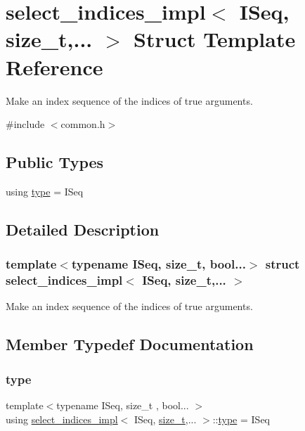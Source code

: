 \hypertarget{structselect__indices__impl}{}\section{select\+\_\+indices\+\_\+impl$<$ I\+Seq, size\+\_\+t,... $>$ Struct Template Reference}
\label{structselect__indices__impl}


Make an index sequence of the indices of true arguments.  




{\ttfamily \#include $<$common.\+h$>$}

\subsection*{Public Types}
\begin{DoxyCompactItemize}
\item 
using \mbox{\hyperlink{structselect__indices__impl_a257bb6e0d732031707917925f457fa16}{type}} = I\+Seq
\end{DoxyCompactItemize}


\subsection{Detailed Description}
\subsubsection*{template$<$typename I\+Seq, size\+\_\+t, bool...$>$\newline
struct select\+\_\+indices\+\_\+impl$<$ I\+Seq, size\+\_\+t,... $>$}

Make an index sequence of the indices of true arguments. 

\subsection{Member Typedef Documentation}
\mbox{\label{structselect__indices__impl_a257bb6e0d732031707917925f457fa16}} 
\subsubsection{\texorpdfstring{type}{type}}
{\footnotesize\ttfamily template$<$typename I\+Seq, size\+\_\+t , bool... $>$ \\
using \mbox{\hyperlink{structselect__indices__impl}{select\+\_\+indices\+\_\+impl}}$<$ I\+Seq, \mbox{\hyperlink{detail_2common_8h_a801d6a451a01953ef8cbae6feb6a3638}{size\+\_\+t}},... $>$\+::\mbox{\hyperlink{structselect__indices__impl_a257bb6e0d732031707917925f457fa16}{type}} =  I\+Seq}




